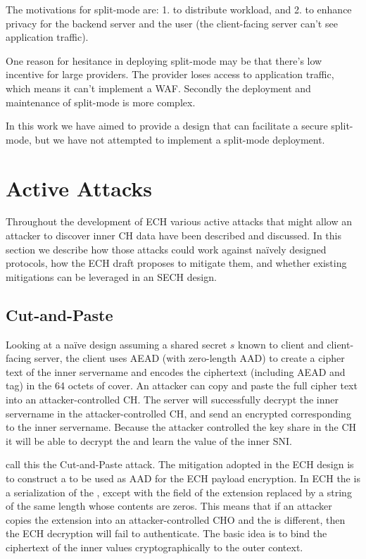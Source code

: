 The motivations for split-mode are:
1. to distribute workload,
and 2. to enhance privacy for the backend server and the user
(the client-facing server can't see application traffic).

One reason for hesitance in deploying split-mode may be that there's low incentive for large providers.
The provider loses access to application traffic,
which means it can't implement a \ac{WAF}.
Secondly the deployment and maintenance
of split-mode is more complex.

In this work we have aimed to provide a design that can facilitate a secure split-mode,
but we have not attempted to implement a
split-mode deployment.

\section{Active Attacks}

\label{sec:active-attacks}
Throughout the development of \ac{ECH} various
active attacks that might allow an attacker to discover inner \ac{CH} data
have been described and discussed.
In this section we describe how those attacks could work against naïvely designed protocols,
how the \ac{ECH} draft proposes to mitigate them,
and whether existing mitigations can be leveraged in an \ac{SECH} design.

\subsection{Cut-and-Paste}

Looking at a naïve design assuming a shared secret $s$ known to client and client-facing server, the client uses \ac{AEAD} (with zero-length \ac{AAD})
to create a cipher text of the inner servername and encodes the ciphertext
(including \ac{AEAD} \nonce and tag)
in the 64 octets of cover.
An attacker can copy and paste the full cipher text into an attacker-controlled \ac{CH}.
The server will successfully decrypt the inner servername in the attacker-controlled \ac{CH},
and send an encrypted  corresponding to the inner servername.
Because the attacker controlled the key share in the \ac{CH} it will be able to decrypt the
 and learn the value of the inner \ac{SNI}.

\cite{esni} call this the Cut-and-Paste attack.
The mitigation adopted in the
\ac{ECH} design is to construct a 
to be used as \ac{AAD}
for the \ac{ECH} payload encryption.
In \ac{ECH} the  is a serialization of the ,
except with the  field of the \varech extension replaced by a string of the same
length whose contents are zeros.
This means that if an attacker copies the \varech extension
into an attacker-controlled \ac{CHO} and the  is different, then
the \ac{ECH}  decryption will fail to authenticate.
The basic idea is to bind the ciphertext of the inner values cryptographically to the outer context.

